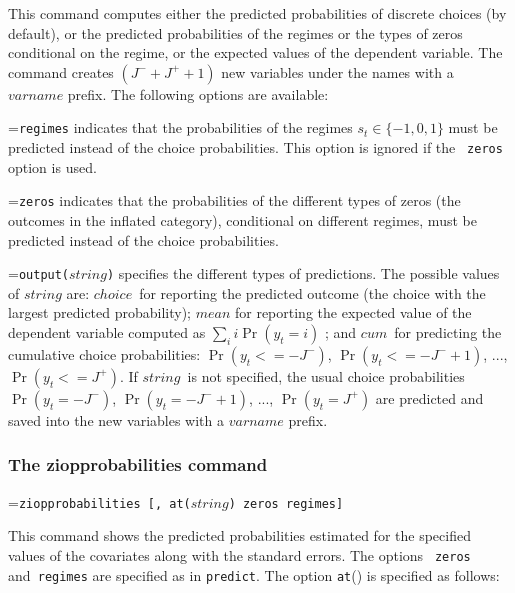 \documentclass[letterpaper,fleqn,12pt]{article}
\begin{document}
\smallskip

This command computes either the predicted probabilities of discrete choices
(by default), or the predicted probabilities of the regimes or the types of
zeros conditional on the regime, or the expected values of the dependent
variable. The command creates $(J^{-}+J^{+}+1)$ new variables under the
names with a \texttt{$varname$} prefix. The following options are available:

\smallskip

\smallskip \hangindent=\parindent\noindent \texttt{regimes} indicates that
the probabilities of the regimes $s_{t}\in \{-1,0,1\}$ must be predicted
instead of the choice probabilities. This option is ignored if the \texttt{%
zeros} option is used.

\medskip

\hangindent=\parindent\noindent \texttt{zeros} indicates that the
probabilities of the different types of zeros (the outcomes in the inflated
category), conditional on different regimes, must be predicted instead of
the choice probabilities.

\smallskip

\hangindent=\parindent\noindent \texttt{output($string$)} specifies the
different types of predictions. The possible values of \texttt{$string$}
are: \texttt{$choice$}\ for reporting the predicted outcome (the choice with
the largest predicted probability); \texttt{$mean$} for reporting the
expected value of the dependent variable computed as $\sum_{i}i\Pr (y_{t}=i)$%
; and \texttt{$cum$}\ for predicting the cumulative choice probabilities: $%
\Pr (y_{t}<=-J^{-})$, $\Pr (y_{t}<=-J^{-}+1)$, ..., $\Pr (y_{t}<=J^{+})$. If 
\texttt{$string$ }is not specified, the usual choice probabilities $\Pr
(y_{t}=-J^{-})$, $\Pr (y_{t}=-J^{-}+1)$, ..., $\Pr (y_{t}=J^{+})$ are
predicted and saved into the new variables with a \texttt{$varname$} prefix.

\subsubsection*{The ziopprobabilities command}

\hangindent=\parindent\noindent \texttt{ziopprobabilities [, at($string$)
zeros regimes]}

\smallskip

This command shows the predicted probabilities estimated for the specified
values of the covariates along with the standard errors. The options \texttt{%
zeros} and\texttt{\ regimes} are specified as in \texttt{predict}. The
option \texttt{at}() is specified as follows:\smallskip
\end{document}
